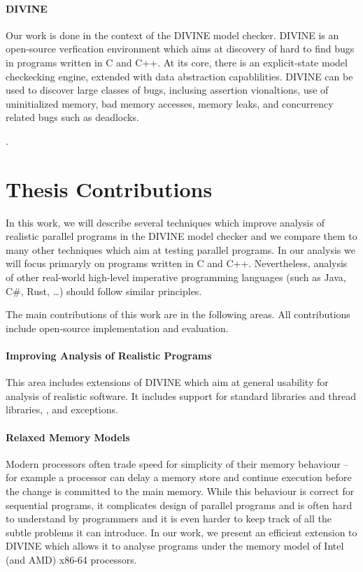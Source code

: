 \paragraph{DIVINE}

Our work is done in the context of the DIVINE model checker.
DIVINE is an open-source verfication environment which aims at discovery of hard to find bugs in programs written in C and C++.
At its core, there is an explicit-state model checkecking engine, extended with data abstraction capablilities.
DIVINE can be used to discover large classes of bugs, inclusing assertion vionaltions, use of uninitialized memory, bad memory accesses, memory leaks, and concurrency related bugs such as deadlocks.


.

\section{Thesis Contributions}

In this work, we will describe several techniques which improve analysis of realistic parallel programs in the DIVINE model checker and we compare them to many other techniques which aim at testing parallel programs.
In our analysis we will focus primaryly on programs written in C and C++.
Nevertheless, analysis of other real-world high-level imperative programming languages (such as Java, C\#, Rust, …) should follow similar principles.

The main contributions of this work are in the following areas.
All contributions include open-source implementation and evaluation.

\paragraph{Improving Analysis of Realistic Programs}

This area includes extensions of DIVINE which aim at general usability for analysis of realistic software.
It includes support for standard libraries and thread libraries, , and exceptions.

\paragraph{Relaxed Memory Models}

Modern processors often trade speed for simplicity of their memory behaviour -- for example a processor can delay a memory store and continue execution before the change is committed to the main memory.
While this behaviour is correct for sequential programs, it complicates design of parallel programs and is often hard to understand by programmers and it is even harder to keep track of all the subtle problems it can introduce.
In our work, we present an efficient extension to DIVINE which allows it to analyse programs under the memory model of Intel (and AMD) x86-64 processors.

